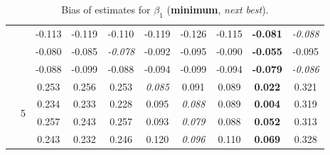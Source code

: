 \documentclass[authoryear, review, 11pt]{elsarticle}
\begin{document}
\begin{table}
\begin{center}
{\begin{tabular}{cccccccccc}
&  & -0.113 & -0.119 & -0.110 & -0.119 & -0.126 & -0.115 & \textbf{-0.081} & \emph{-0.088} \\ 
&  & -0.080 & -0.085 & \emph{-0.078} & -0.092 & -0.095 & -0.090 & \textbf{-0.055} & -0.095 \\ 
&  & -0.088 & -0.099 & -0.088 & -0.094 & -0.099 & -0.094 & \textbf{-0.079} & \emph{-0.086} \\ 
		  \cline{3-10}
		  & \multirow{4}{*}{5} & 0.253 & 0.256 & 0.253 & \emph{0.085} & 0.091 & 0.089 & \textbf{0.022} & 0.321 \\ 
&  & 0.234 & 0.233 & 0.228 & 0.095 & \emph{0.088} & 0.089 & \textbf{0.004} & 0.319 \\ 
&  & 0.257 & 0.243 & 0.257 & 0.093 & \emph{0.079} & 0.088 & \textbf{0.052} & 0.313 \\ 
&  & 0.243 & 0.232 & 0.246 & 0.120 & \emph{0.096} & 0.110 & \textbf{0.069} & 0.328 \\ 
		\end{tabular}}
		\caption{Bias of estimates for $\beta_1$ (\textbf{minimum}, \emph{next best}).\label{table:X1-bias}}
		\end{center}
		\end{table}	

		
		
\end{document}
